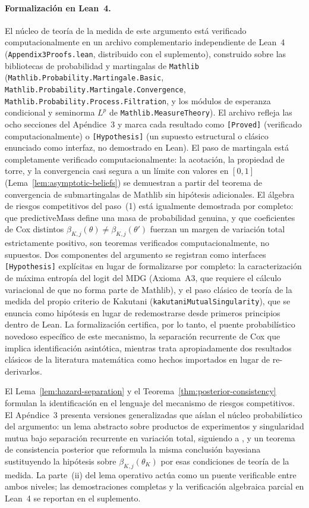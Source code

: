 \documentclass[review,authoryear,12pt]{elsarticle}
\theoremstyle{plain}
\theoremstyle{definition}
\newcommand{\1}{\mathbf{1}}
\begin{document}
\paragraph{Formalización en Lean~4.} El núcleo de teoría de la medida de este argumento está verificado computacionalmente en un archivo complementario independiente de Lean~4 (\texttt{Appendix3Proofs.lean}, distribuido con el suplemento), construido sobre las bibliotecas de probabilidad y martingalas de \texttt{Mathlib} (\texttt{Mathlib.Probability.Martingale.Basic}, \texttt{Mathlib.Probability.Martingale.Convergence}, \texttt{Mathlib.Probability.Process.Filtration}, y los módulos de esperanza condicional y seminorma $L^p$ de \texttt{Mathlib.MeasureTheory}). El archivo refleja las ocho secciones del Apéndice~3 y marca cada resultado como \texttt{[Proved]} (verificado computacionalmente) o \texttt{[Hypothesis]} (un supuesto estructural o clásico enunciado como interfaz, no demostrado en Lean). El paso de martingala está completamente verificado computacionalmente: la acotación, la propiedad de torre, y la convergencia casi segura a un límite con valores en $[0,1]$ (Lema~\ref{lem:asymptotic-beliefs}) se demuestran a partir del teorema de convergencia de submartingalas de Mathlib sin hipótesis adicionales. El álgebra de riesgos competitivos del paso~(1) está igualmente demostrada por completo: que $\mathrm{predictiveMass}$ define una masa de probabilidad genuina, y que coeficientes de Cox distintos $\beta_{K,j}(\theta)\neq\beta_{K,j}(\theta')$ fuerzan un margen de variación total estrictamente positivo, son teoremas verificados computacionalmente, no supuestos. Dos componentes del argumento se registran como interfaces \texttt{[Hypothesis]} explícitas en lugar de formalizarse por completo: la caracterización de máxima entropía del logit del MDG (Axioma~A3, que requiere el cálculo variacional de \citealt{Jaynes1957Information} que no forma parte de Mathlib), y el paso clásico de teoría de la medida del propio criterio de Kakutani (\texttt{kakutaniMutualSingularity}), que se enuncia como hipótesis en lugar de redemostrarse desde primeros principios dentro de Lean. La formalización certifica, por lo tanto, el puente probabilístico novedoso específico de este mecanismo, la separación recurrente de Cox que implica identificación asintótica, mientras trata apropiadamente dos resultados clásicos de la literatura matemática como hechos importados en lugar de re-derivarlos.

El Lema~\ref{lem:hazard-separation} y el Teorema~\ref{thm:posterior-consistency} formulan la identificación en el lenguaje del mecanismo de riesgos competitivos. El Apéndice~3 presenta versiones generalizadas que aíslan el núcleo probabilístico del argumento: un lema abstracto sobre productos de experimentos y singularidad mutua bajo separación recurrente en variación total, siguiendo a \citet{Kakutani1948}, y un teorema de consistencia posterior que reformula la misma conclusión bayesiana sustituyendo la hipótesis sobre $\beta_{K,j}(\theta_K)$ por esas condiciones de teoría de la medida. La parte~\textup{(ii)} del lema operativo actúa como un puente verificable entre ambos niveles; las demostraciones completas y la verificación algebraica parcial en Lean~4 se reportan en el suplemento.
\end{document}
